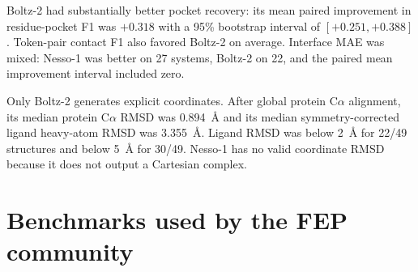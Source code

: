\documentclass[11pt]{article}
\begin{document}
Boltz-2 had substantially better pocket recovery: its mean paired improvement
in residue-pocket F1 was $+0.318$ with a 95\% bootstrap interval of
$[+0.251,+0.388]$. Token-pair contact F1 also favored Boltz-2 on average. Interface MAE
was mixed: Nesso-1 was better on 27 systems, Boltz-2 on 22, and the paired mean
improvement interval included zero.

Only Boltz-2 generates explicit coordinates. After global protein C$\alpha$
alignment, its median protein C$\alpha$ RMSD was 0.894~\AA{} and its median
symmetry-corrected ligand heavy-atom RMSD was 3.355~\AA{}. Ligand RMSD was below
2~\AA{} for 22/49 structures and below 5~\AA{} for 30/49. Nesso-1 has no valid
coordinate RMSD because it does not output a Cartesian complex.

\section{Benchmarks used by the FEP community}

\end{document}
